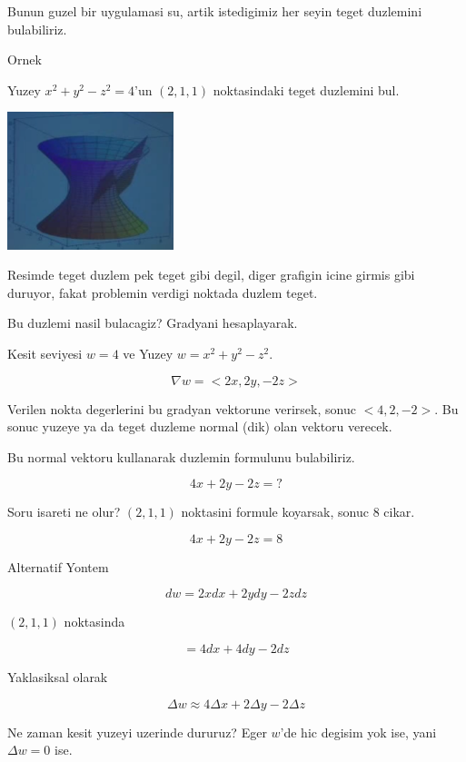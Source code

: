 \documentclass[12pt,fleqn]{article}
\begin{document}
Bunun guzel bir uygulamasi su, artik istedigimiz her seyin teget duzlemini
bulabiliriz. 

Ornek

Yuzey $x^2 + y^2 - z^2 = 4$'un $(2,1,1)$ noktasindaki teget duzlemini bul. 

\includegraphics[height=4cm]{12_5.png}

Resimde teget duzlem pek teget gibi degil, diger grafigin icine girmis gibi
duruyor, fakat problemin verdigi noktada duzlem teget. 

Bu duzlemi nasil bulacagiz? Gradyani hesaplayarak. 

Kesit seviyesi $w=4$ ve Yuzey $w = x^2 + y^2 - z^2$. 

\[ \nabla w = <2x, 2y, -2z> \]

Verilen nokta degerlerini bu gradyan vektorune verirsek, sonuc
$<4,2,-2>$. Bu sonuc yuzeye ya da teget duzleme normal (dik) olan 
vektoru verecek. 

Bu normal vektoru kullanarak duzlemin formulunu bulabiliriz. 

\[ 4x + 2y - 2z = ? \]

Soru isareti ne olur? $(2,1,1)$ noktasini formule koyarsak, sonuc 8 cikar.

\[ 4x + 2y - 2z = 8 \]

Alternatif Yontem

\[ dw = 2x dx + 2y dy -2z dz \]

$(2,1,1)$ noktasinda

\[ = 4dx + 4dy - 2dz \]

Yaklasiksal olarak 

\[ \Delta w \approx 4 \Delta x + 2\Delta y - 2\Delta z  \]

Ne zaman kesit yuzeyi uzerinde dururuz? Eger $w$'de hic degisim yok ise,
yani $\Delta w = 0$ ise.
\end{document}
